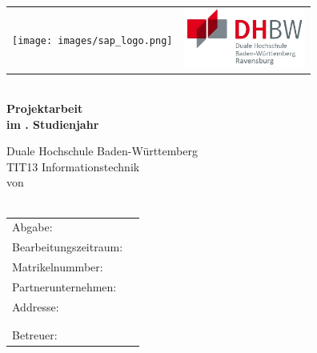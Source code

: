 \begin{titlepage}

\begin{table}
\begin{tabular}{p{}p{}}
\texttt{[image: images/sap\_logo.png]} &
\hfill \includegraphics[width=4cm]{images/dhbw_logo.jpg} \\
\end{tabular}
\end{table}

	\begin{center}
		\vspace*{1cm}
		\LARGE\bf\myTopic\\
		\vspace*{1cm}
		\bf Projektarbeit\\
		
		\normalsize\rm
		 im \myPraxPhase. Studienjahr \\
		\vspace*{1cm}
		
		Duale Hochschule Baden-Württemberg\\
		\vspace*{0.5cm}
		TIT13 Informationstechnik\\
		\vspace*{1cm}
		von\\
		 \myAutor\\
		\vspace*{1cm}
		
		\vfill
	\end{center}
	\begin{tabular}{ll}
		Abgabe:&\myEndDate\\
		Bearbeitungszeitraum:&\myEditDate\\
		Matrikelnummber:&\myMatNr\\
		Partnerunternehmen:&\myCompany\\
		Addresse:&\myCompanyAddressStreet\\
					&\myCompanyAddressCity\\
		\\
		Betreuer:&\myProf\\
		
	\end{tabular}
	\newline
	\vspace*{1cm}
\end{titlepage}
\newpage
\setcounter{page}{2}
